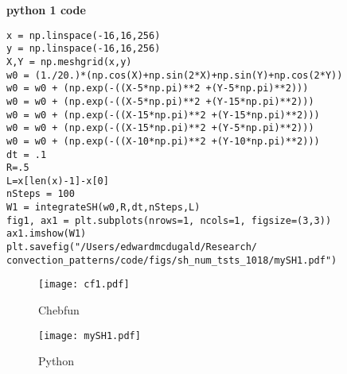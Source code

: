\documentclass[12pt]{article}
\begin{document}
\textbf{python 1 code}
\begin{verbatim}
x = np.linspace(-16,16,256)
y = np.linspace(-16,16,256)
X,Y = np.meshgrid(x,y)
w0 = (1./20.)*(np.cos(X)+np.sin(2*X)+np.sin(Y)+np.cos(2*Y))
w0 = w0 + (np.exp(-((X-5*np.pi)**2 +(Y-5*np.pi)**2)))
w0 = w0 + (np.exp(-((X-5*np.pi)**2 +(Y-15*np.pi)**2)))
w0 = w0 + (np.exp(-((X-15*np.pi)**2 +(Y-15*np.pi)**2)))
w0 = w0 + (np.exp(-((X-15*np.pi)**2 +(Y-5*np.pi)**2)))
w0 = w0 + (np.exp(-((X-10*np.pi)**2 +(Y-10*np.pi)**2)))
dt = .1
R=.5
L=x[len(x)-1]-x[0]
nSteps = 100
W1 = integrateSH(w0,R,dt,nSteps,L)
fig1, ax1 = plt.subplots(nrows=1, ncols=1, figsize=(3,3))
ax1.imshow(W1)
plt.savefig("/Users/edwardmcdugald/Research/
convection_patterns/code/figs/sh_num_tsts_1018/mySH1.pdf")
\end{verbatim}

\begin{figure}
\centering
\parbox{7cm}{
\texttt{[image: cf1.pdf]}
\caption{Chebfun}
\label{fig:2figsA}}
\qquad
\begin{minipage}{7cm}
\texttt{[image: mySH1.pdf]}
\caption{Python}
\label{fig:2figsB}
\end{minipage}
\end{figure}

\end{document}
